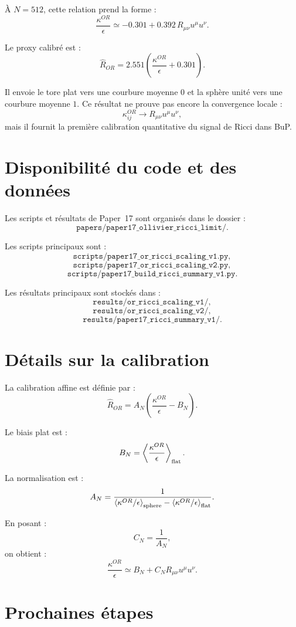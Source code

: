 \documentclass[11pt,a4paper]{article}
\begin{document}
À \(N=512\), cette relation prend la forme :
\[
\frac{\kappa^{OR}}{\epsilon}
\simeq
-0.301
+
0.392\,R_{\mu\nu}u^\mu u^\nu.
\]

Le proxy calibré est :
\[
\widehat{R}_{OR}
=
2.551
\left(
\frac{\kappa^{OR}}{\epsilon}
+
0.301
\right).
\]

Il envoie le tore plat vers une courbure moyenne \(0\) et la sphère unité vers
une courbure moyenne \(1\). Ce résultat ne prouve pas encore la convergence
locale :
\[
\kappa_{ij}^{OR}
\to
R_{\mu\nu}u^\mu u^\nu,
\]
mais il fournit la première calibration quantitative du signal de Ricci dans
BuP.

\section*{Disponibilité du code et des données}

Les scripts et résultats de Paper~17 sont organisés dans le dossier :
\[
\texttt{papers/paper17\_ollivier\_ricci\_limit/}.
\]

Les scripts principaux sont :
\[
\texttt{scripts/paper17\_or\_ricci\_scaling\_v1.py},
\]
\[
\texttt{scripts/paper17\_or\_ricci\_scaling\_v2.py},
\]
\[
\texttt{scripts/paper17\_build\_ricci\_summary\_v1.py}.
\]

Les résultats principaux sont stockés dans :
\[
\texttt{results/or\_ricci\_scaling\_v1/},
\]
\[
\texttt{results/or\_ricci\_scaling\_v2/},
\]
\[
\texttt{results/paper17\_ricci\_summary\_v1/}.
\]

\appendix

\section{Détails sur la calibration}

La calibration affine est définie par :
\[
\widehat{R}_{OR}
=
A_N
\left(
\frac{\kappa^{OR}}{\epsilon}
-
B_N
\right).
\]

Le biais plat est :
\[
B_N=
\left\langle
\frac{\kappa^{OR}}{\epsilon}
\right\rangle_{\rm flat}.
\]

La normalisation est :
\[
A_N=
\frac{1}{
\left\langle\kappa^{OR}/\epsilon\right\rangle_{\rm sphere}
-
\left\langle\kappa^{OR}/\epsilon\right\rangle_{\rm flat}
}.
\]

En posant :
\[
C_N=\frac{1}{A_N},
\]
on obtient :
\[
\frac{\kappa^{OR}}{\epsilon}
\simeq
B_N+C_N R_{\mu\nu}u^\mu u^\nu.
\]

\section{Prochaines étapes}
\end{document}
